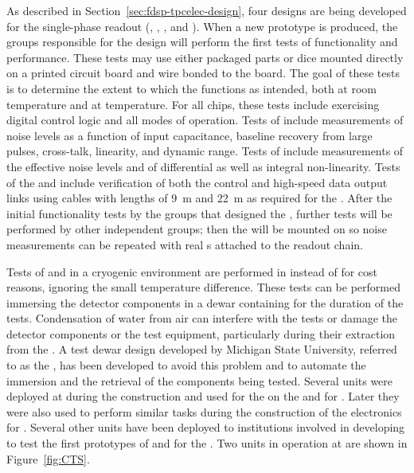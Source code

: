 As described in Section~\ref{sec:fdsp-tpcelec-design}, four  designs
are being developed for the   single-phase  readout 
(, , , and ). 
When a new prototype  is produced, the groups responsible for the  design will perform the first tests of 
 functionality and performance. These tests may use either 
packaged parts or dice mounted directly on a printed circuit board 
and wire bonded to the board.  The goal of these tests is to determine 
the extent to which the  functions as intended, both at room 
temperature and at \lntwo temperature.  For all chips, these tests 
include exercising digital control logic and all modes of operation. Tests 
of   include measurements of noise levels as a function 
of input capacitance, baseline recovery from large pulses, cross-talk, linearity, 
and dynamic range. Tests of  include measurements of the effective noise levels and 
of differential as well as integral non-linearity. Tests of the  and  
include verification of both the control and high-speed data output links using 
cables with lengths of \SI{9}{m} and \SI{22}{m} as required for the  .
After the initial functionality
tests by the groups that designed the , further
tests will be performed by other independent groups; then the 
will be mounted on  so noise measurements can be repeated
with real s attached to the readout chain.

Tests of  and  in a cryogenic environment
are performed in \lntwo instead of  for cost reasons, ignoring
the small temperature difference. These tests can be performed immersing
the detector components in a dewar containing \lntwo for the duration
of the tests. Condensation of water from air can interfere with
the tests or damage the detector components or the test equipment,
particularly during their extraction from the \lntwo. A test dewar
design developed by Michigan State University, referred to as the
, has been developed to avoid
this problem and to automate the immersion and the retrieval of 
the components being tested. Several  units
were deployed at  during the  construction
and used for the  on the  and 
for . Later they were also used to perform similar tasks
during the construction of the electronics for .
Several other  units have been deployed to institutions involved in
developing  to test the first prototypes of 
and  for the  . Two  units 
in operation at  are shown in Figure~\ref{fig:CTS}.

